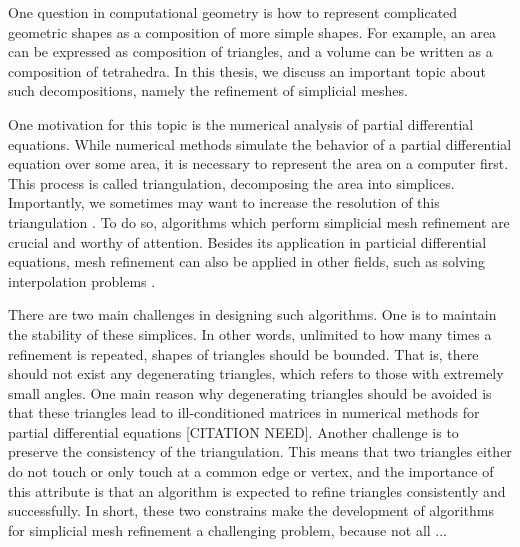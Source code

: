One question in computational geometry is how to represent complicated geometric shapes as a composition of more simple shapes. For example, an area can be expressed as composition of triangles, and a volume can be written as a composition of tetrahedra. In this thesis, we discuss an important topic about such decompositions, namely the refinement of simplicial meshes.

One motivation for this topic is the numerical analysis of partial differential equations. While numerical methods simulate the behavior of a partial differential equation over some area, it is necessary  to represent the area on a computer first. This process is called triangulation, decomposing the area into simplices. Importantly, we sometimes may want to increase the resolution of this triangulation \cite{grosso1998hierarchical}. To do so, algorithms which perform simplicial mesh refinement are crucial and worthy of attention. Besides its application in particial differential equations, mesh refinement can also be applied in other fields, such as solving interpolation problems \cite{moore1992simplical}.

There are two main challenges in designing such algorithms. One is to maintain the stability of these simplices. In other words, unlimited to how many times a refinement is repeated, shapes of triangles should be bounded. That is, there should not exist any degenerating triangles, which refers to those with extremely small angles. One main reason why degenerating triangles should be avoided is that these triangles lead to ill-conditioned matrices in numerical methods for partial differential equations [CITATION NEED]. Another challenge is to  preserve the consistency of the triangulation. This means that two triangles either do not touch or only touch at a common edge or vertex, and the importance of this attribute is that an algorithm is expected to refine triangles consistently and successfully. In short, these two constrains make the development of algorithms for simplicial mesh refinement a challenging problem, because not all  ...

